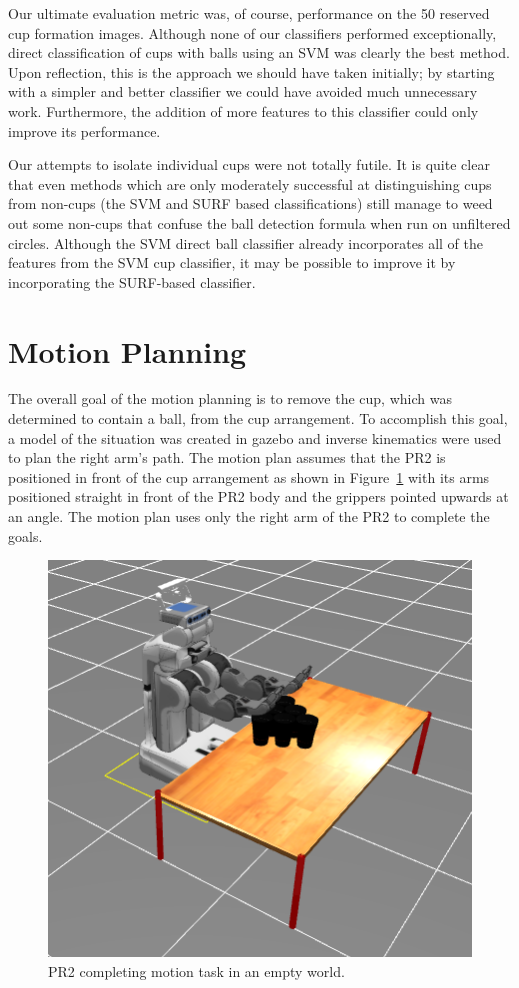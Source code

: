 \documentclass[letterpaper, 10 pt, conference]{ieeeconf}  %
\begin{document}
Our ultimate evaluation metric was, of course, performance on the 50 reserved cup formation images.  Although none of our classifiers performed exceptionally, direct classification of cups with balls using an SVM was clearly the best method.  Upon reflection, this is the approach we should have taken initially; by starting with a simpler and better classifier we could have avoided much unnecessary work.  Furthermore, the addition of more features to this classifier could only improve its performance.

Our attempts to isolate individual cups were not totally futile.  It is quite clear that even methods which are only moderately successful at distinguishing cups from non-cups (the SVM and SURF based classifications) still manage to weed out some non-cups that confuse the ball detection formula when run on unfiltered circles.  Although the SVM direct ball classifier already incorporates all of the features from the SVM cup classifier, it may be possible to improve it by incorporating the SURF-based classifier.

\section{Motion Planning}

The overall goal of the motion planning is to remove the cup, which was determined to contain a ball, from the cup arrangement. To accomplish this goal,  a model of the situation was created in gazebo and inverse kinematics were used to plan the right arm's path. The motion plan assumes that the PR2 is positioned in front of the cup arrangement as shown in Figure~\ref{fig:start} with its arms positioned straight in front of the PR2 body and the grippers pointed upwards at an angle. The motion plan uses only the right arm of the PR2 to complete the goals.

\begin{figure}[thpb]
      \centering
	  \includegraphics[scale =0.2]{cups_pr2_table}
      \caption{PR2 completing motion task in an empty world.}
      \label{fig:start}
\end{figure}
\end{document}
